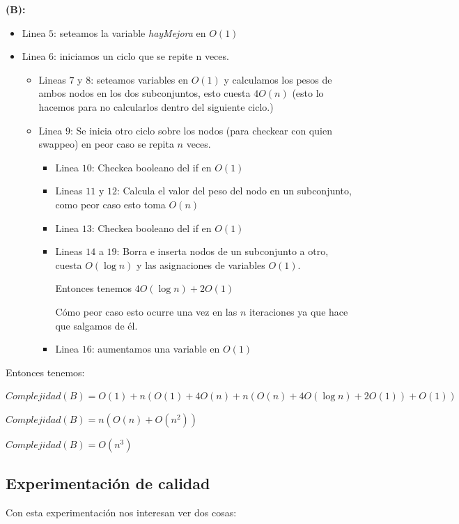 \textbf{(B):}

\begin{itemize}
    \item Linea $5$: seteamos la variable \textit{hayMejora} en $O(1)$
    \item Linea $6$: iniciamos un ciclo que se repite n veces.
    \begin{itemize}
        \item Lineas $7$ y $8$: seteamos variables en $O(1)$ y calculamos los pesos de ambos nodos en los dos subconjuntos, esto cuesta $4O(n)$ (esto lo hacemos para no calcularlos dentro del siguiente ciclo.)
        \item Linea $9$: Se inicia otro ciclo sobre los nodos (para checkear con quien swappeo) en peor caso se repita $n$ veces.
        \begin{itemize}
            \item Linea $10$: Checkea booleano del if en $O(1)$
            \item Lineas $11$ y $12$: Calcula el valor del peso del nodo en un subconjunto, como peor caso esto toma $O(n)$
            \item Linea $13$: Checkea booleano del if en $O(1)$
            \item Lineas $14$ a $19$: Borra e inserta nodos de un subconjunto a otro, cuesta $O(\log n)$ y las asignaciones de variables $O(1)$. 

            Entonces tenemos $4O(\log n) + 2O(1)$

            Cómo peor caso esto ocurre una vez en las $n$ iteraciones ya que hace que salgamos de él.
            \item Linea $16$: aumentamos una variable en $O(1)$
        \end{itemize}
    \end{itemize}
\end{itemize}

Entonces tenemos:
\begin{center}
  $Complejidad(B) = O(1) + n(O(1)+4O(n)+n(O(n)+4O(\log n)+2O(1))+O(1))$

  $Complejidad(B) = n(O(n)+O(n^2))$ 

  $Complejidad(B) = O(n^3)$
\end{center}

\subsection{Experimentación de calidad}
Con esta experimentación nos interesan ver dos cosas:

